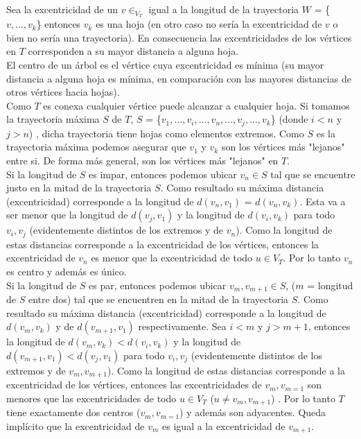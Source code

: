 \documentclass[12pt]{article}
\begin{document}
Sea la excentricidad de un $v\in_{V_T}$ igual a la longitud de la trayectoria $W$ = \{$v,...,v_k$\} entonces $v_k$ es una hoja (en otro caso no sería la excentricidad de $v$ o bien no sería una trayectoria). En consecuencia las excentricidades de los vértices en $T$ corresponden a su mayor distancia a alguna hoja.\\

El centro de un árbol es el vértice cuya excentricidad es mínima (su mayor distancia a alguna hoja es mínima, en comparación con las mayores distancias de otros vértices hacia hojas).\\ 

Como $T$ es conexa cualquier vértice puede alcanzar a cualquier hoja. Si tomamos la trayectoria máxima $S$ de $T$, $S$ = \{$v_1,...,v_i,...,v_n,...,v_j,...,v_k$\} (donde $i < n$ y $j >n$) , dicha trayectoria tiene hojas como elementos extremos. Como $S$ es la trayectoria máxima podemos asegurar que $v_1$ y $v_k$ son los vértices más "lejanos" entre si. De forma más general, son los vértices más "lejanos" en $T$.\\

Si la longitud de $S$ es impar, entonces podemos ubicar $v_n \in S$ tal que se encuentre justo en la mitad de la trayectoria $S$. Como resultado su máxima distancia (excentricidad) corresponde a la longitud de $d(v_n, v_1)$ = $d(v_n, v_k)$. Esta va a ser menor que la longitud de $d(v_j,v_1)$ y la longitud de $d(v_i,v_k)$ para todo $v_i,v_j$ (evidentemente distintos de los extremos y de $v_n$). Como la longitud de estas distancias corresponde a la excentricidad de los vértices, entonces la excentricidad de $v_n$ es menor que la excentricidad de todo $u \in {V_T}$. Por lo tanto $v_n$ es centro y además es único.\\

Si la longitud de $S$ es par, entonces podemos ubicar $v_m,v_{m+1} \in S$, ($m$ = longitud de $S$ entre dos) tal que se encuentren en la mitad de la trayectoria $S$. Como resultado su máxima distancia (excentricidad) corresponde a la longitud de $d(v_m, v_k)$ y de $d(v_{m+1}, v_1)$ respectivamente. Sea $i < m$ y $j > m + 1$, entonces la longitud de  $d(v_m,v_k) < d(v_i,v_k)$ y la longitud de $d(v_{m+1},v_1) < d(v_j,v_1)$ para todo $v_i,v_j$ (evidentemente distintos de los extremos y de $v_m,v_{m+1}$). Como la longitud de estas distancias corresponde a la excentricidad de los vértices, entonces las excentricidades de $v_m,v_{m=1}$ son menores que las excentricidades de todo $u \in {V_T}$ ($u \neq v_m,v_{m+1}$)  . Por lo tanto $T$ tiene exactamente dos centros ($v_m,v_{m=1}$) y además son adyacentes. Queda implícito que la excentricidad de $v_m$ es igual a la excentricidad de $v_{m+1}$.
\end{document}
